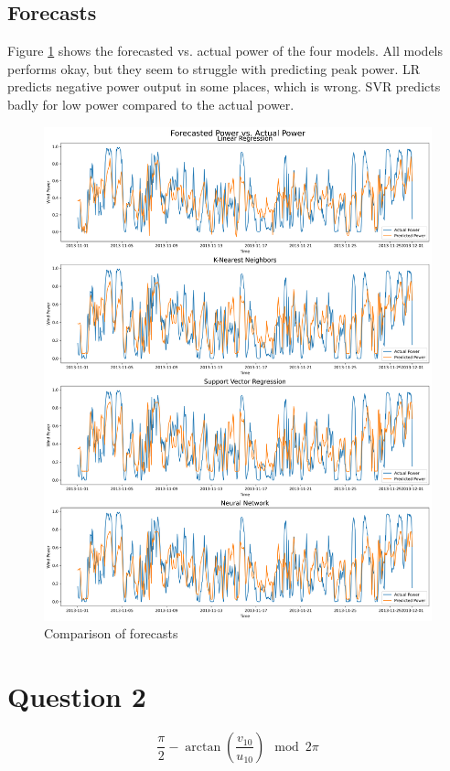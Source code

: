 \documentclass[a4paper, article, oneside, USenglish, IN5460]{memoir}
\begin{document}
\section{Forecasts}
Figure \ref{fig:q1-forecast-comparison}  shows the forecasted vs. actual power of the four models. All models performs okay, but they seem to struggle with predicting peak power. LR predicts negative power output in some places, which is wrong. SVR predicts badly for low power compared to the actual power. 
\begin{figure}[H]
    \centering
    \includegraphics[width=1\linewidth]{fig/q1-ALL-forecast.png}
    \caption{Comparison of forecasts }
    \label{fig:q1-forecast-comparison}
\end{figure}


\chapter{Question 2}


\begin{equation}
\frac{\pi}{2} - \arctan \left(\frac{v_{10}}{u_{10}}\right) \mod 2\pi


\end{equation}
\end{document}
